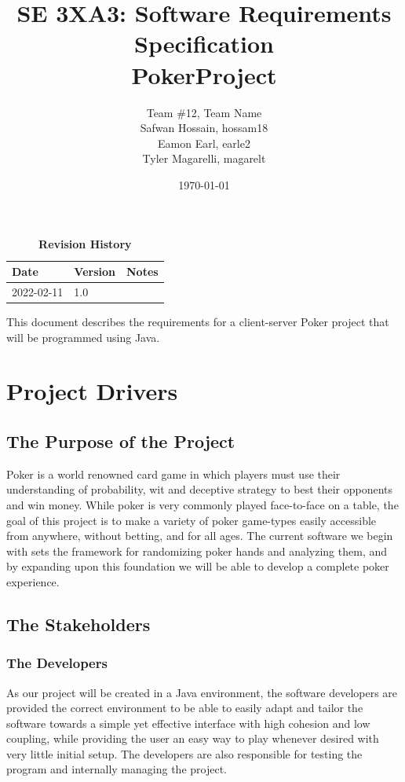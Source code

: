 \documentclass[12pt, titlepage]{article}
\title{SE 3XA3: Software Requirements Specification\\PokerProject}
\author{Team \#12, Team Name
		\\ Safwan Hossain, hossam18
		\\ Eamon Earl, earle2
		\\ Tyler Magarelli, magarelt
}
\date{\today}
\begin{document}
\maketitle

\tableofcontents
\listoftables
\listoffigures

\begin{table}[bp]
\caption{\bf Revision History}
\begin{tabularx}{\textwidth}{p{3cm}p{2cm}X}
\toprule {\bf Date} & {\bf Version} & {\bf Notes}\\
\midrule
2022-02-11 & 1.0 & \\
\bottomrule
\end{tabularx}
\end{table}

\newpage


This document describes the requirements for a client-server Poker project that will be programmed using Java.

\section{Project Drivers}

\subsection{The Purpose of the Project}
Poker is a world renowned card game in which players must use their understanding of probability,
wit and deceptive strategy to best their opponents and win money. While poker is very commonly
played face-to-face on a table, the goal of this project is to make a variety of poker game-types easily
accessible from anywhere, without betting, and for all ages. The current software we begin with sets the framework for randomizing
poker hands and analyzing them, and by expanding upon this foundation we will be able to develop a complete poker
experience.
\subsection{The Stakeholders}

\subsubsection{The Developers}
As our project will be created in a Java environment, the software developers are provided the correct environment to be able to easily adapt and tailor the software towards a simple yet effective interface with high cohesion and low coupling,
while providing the user an easy way to play whenever desired with very little initial setup. The developers are also responsible for testing the program and internally managing the project.
\end{document}
